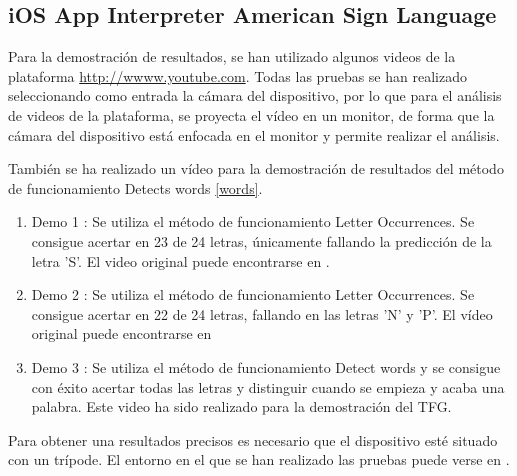 \documentclass[../main.tex]{subfiles}
\begin{document}
\subsection{iOS App Interpreter American Sign Language}

Para la demostración de resultados, se han utilizado algunos videos de la plataforma \url{http://wwww.youtube.com}. Todas las pruebas se han realizado seleccionando como entrada la cámara del dispositivo, por lo que para el análisis de videos de la plataforma, se proyecta el vídeo en un monitor, de forma que la cámara del dispositivo está enfocada en el monitor y permite realizar el análisis.

También se ha realizado un vídeo para la demostración de resultados del método de funcionamiento Detects words \ref{words}.


\begin{enumerate}
    \item Demo 1 \cite{demo1}: Se utiliza el método de funcionamiento Letter Occurrences. Se consigue acertar en 23 de 24 letras, únicamente fallando la predicción de la letra 'S'. El video original puede encontrarse en \cite{demo1original}.
    \item Demo 2 \cite{demo2}: Se utiliza el método de funcionamiento Letter Occurrences. Se consigue acertar en 22 de 24 letras, fallando en las letras 'N' y 'P'. El vídeo original puede encontrarse en \cite{demo2original}
    \item Demo 3 \cite{demoword}: Se utiliza el método de funcionamiento Detect words y se consigue con éxito acertar todas las letras y distinguir cuando se empieza y acaba una palabra. Este video ha sido realizado para la demostración del TFG.
\end{enumerate}

Para obtener una resultados precisos es necesario que el dispositivo esté situado con un trípode. El entorno en el que se han realizado las pruebas puede verse en \cite{demo1env}.
\end{document}
